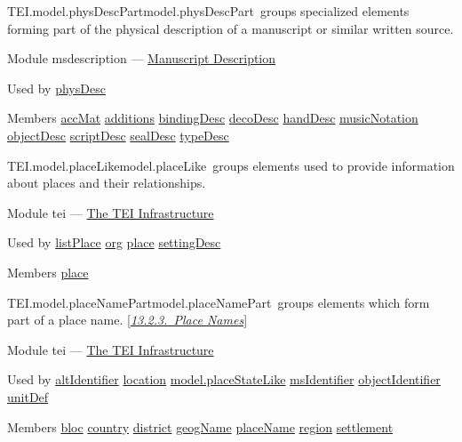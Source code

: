 \begin{reflist}
\item[]\begin{specHead}{TEI.model.physDescPart}{model.physDescPart} groups specialized elements forming part of the physical description of a manuscript or similar written source.\end{specHead} 
    \item[{Module}]
  msdescription — \hyperref[MS]{Manuscript Description}
    \item[{Used by}]
  \hyperref[TEI.physDesc]{physDesc}
    \item[{Members}]
  \hyperref[TEI.accMat]{accMat} \hyperref[TEI.additions]{additions} \hyperref[TEI.bindingDesc]{bindingDesc} \hyperref[TEI.decoDesc]{decoDesc} \hyperref[TEI.handDesc]{handDesc} \hyperref[TEI.musicNotation]{musicNotation} \hyperref[TEI.objectDesc]{objectDesc} \hyperref[TEI.scriptDesc]{scriptDesc} \hyperref[TEI.sealDesc]{sealDesc} \hyperref[TEI.typeDesc]{typeDesc}
\end{reflist}  
\begin{reflist}
\item[]\begin{specHead}{TEI.model.placeLike}{model.placeLike} groups elements used to provide information about places and their relationships.\end{specHead} 
    \item[{Module}]
  tei — \hyperref[ST]{The TEI Infrastructure}
    \item[{Used by}]
  \hyperref[TEI.listPlace]{listPlace} \hyperref[TEI.org]{org} \hyperref[TEI.place]{place} \hyperref[TEI.settingDesc]{settingDesc}
    \item[{Members}]
  \hyperref[TEI.place]{place}
\end{reflist}  
\begin{reflist}
\item[]\begin{specHead}{TEI.model.placeNamePart}{model.placeNamePart} groups elements which form part of a place name. [\textit{\hyperref[NDPLAC]{13.2.3.\ Place Names}}]\end{specHead} 
    \item[{Module}]
  tei — \hyperref[ST]{The TEI Infrastructure}
    \item[{Used by}]
  \hyperref[TEI.altIdentifier]{altIdentifier} \hyperref[TEI.location]{location} \hyperref[TEI.model.placeStateLike]{model.placeStateLike} \hyperref[TEI.msIdentifier]{msIdentifier} \hyperref[TEI.objectIdentifier]{objectIdentifier} \hyperref[TEI.unitDef]{unitDef}
    \item[{Members}]
  \hyperref[TEI.bloc]{bloc} \hyperref[TEI.country]{country} \hyperref[TEI.district]{district} \hyperref[TEI.geogName]{geogName} \hyperref[TEI.placeName]{placeName} \hyperref[TEI.region]{region} \hyperref[TEI.settlement]{settlement}
\end{reflist}  

